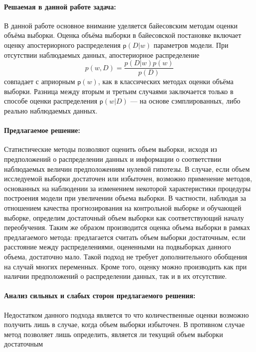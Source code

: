 \documentclass[12pt,twoside]{article}
\begin{document}
\paragraph{Решаемая в данной работе задача:}
В данной работе основное внимание уделяется байесовским методам оценки объёма выборки. Оценка объёма выборки в байесовской постановке включает оценку апостериорного распределения $\mathsf{p}(D|w)$ параметров модели. При отсутствии наблюдаемых данных, апостериорное распределение$$ p(w,D) = \frac{p(D|w)p(w)}{p(D)}$$ совпадает с априорным $\mathsf{p}(w)$, как в классических методах оценки объёма выборки. Разница между вторым и третьим случаями заключается только в способе оценки распределения $\mathsf{p}(w|D)$ — на основе сэмплированных, либо реально наблюдаемых данных.

\paragraph{Предлагаемое решение:}
Статистические методы позволяют оценить объем выборки, исходя из предположений о распределении данных и информации о соответствии наблюдаемых величин предположениям нулевой гипотезы. В случае, если объем исследуемой выборки достаточен или избыточен, возможно применение методов, основанных на наблюдении за изменением некоторой характеристики процедуры построения модели при увеличении объема выборки. В частности, наблюдая за отношением качества прогнозирования на контрольной выборке и обучающей выборке, определим достаточный объем выборки как соответствующий началу переобучения. Таким же образом производится оценка объема выборки в рамках предлагаемого метода: предлагается считать объем выборки достаточным, если расстояние между распределениями, оцененными на подвыборках данного объема, достаточно мало. Такой подход не требует дополнительного обобщения на случай многих переменных. Кроме того, оценку можно производить как при наличии предположений о распределении данных, так и в их отсутствие.
\paragraph{Анализ сильных и слабых сторон предлагаемого решения:}
Недостатком данного подхода является то что количественные оценки возможно получить лишь в случае, когда объем выборки избыточен. В противном случае метод позволяет лишь определить, является ли текущий объем выборки достаточным
\subsection{}
\end{document}
